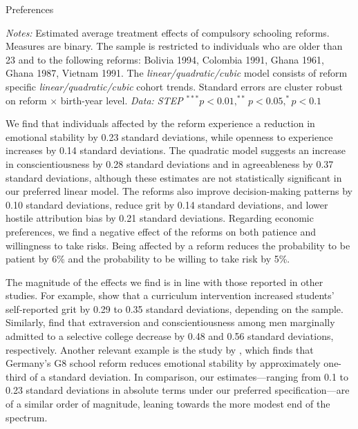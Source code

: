 \begin{table}[htbp]
	\caption{Preferences}
	\label{tab:res_prefs}
	\centering
	\begin{threeparttable}
		\footnotesize
		
		\begin{tablenotes}
			\footnotesize
			\item \textit{Notes:} Estimated average treatment effects of compulsory schooling reforms. Measures are binary. The sample is restricted to individuals who are older than 23 and to the following reforms: Bolivia 1994, Colombia 1991, Ghana 1961, Ghana 1987, Vietnam 1991. The \textit{linear/quadratic/cubic} model consists of reform specific \textit{linear/quadratic/cubic} cohort trends. Standard errors are cluster robust on reform $\times$ birth-year level. \textit{Data: STEP} $^{***} p < 0.01, ^{**} p < 0.05, ^{*} p < 0.1$
		\end{tablenotes}
	\end{threeparttable}
\end{table}


We find that individuals affected by the reform experience a reduction in emotional stability by 0.23 standard deviations, while openness to experience increases by 0.14 standard deviations. The quadratic model suggests an increase in conscientiousness by 0.28 standard deviations and in agreeableness by 0.37 standard deviations, although these estimates are not statistically significant in our preferred linear model.
The reforms also improve decision-making patterns by 0.10 standard deviations, reduce grit by 0.14 standard deviations, and lower hostile attribution bias by 0.21 standard deviations. Regarding economic preferences, we find a negative effect of the reforms on both patience and willingness to take risks. Being affected by a reform reduces the probability to be patient by 6\% and the probability to be willing to take risk by 5\%.

The magnitude of the effects we find is in line with those reported in other studies. For example, \citet{alan_ever_2019} show that a curriculum intervention increased students' self-reported grit by 0.29 to 0.35 standard deviations, depending on the sample. Similarly, \citet{dasgupta_effects_2022} find that extraversion and conscientiousness among men marginally admitted to a selective college decrease by 0.48 and 0.56 standard deviations, respectively. Another relevant example is the study by \citet{dahmann_cross-fertilizing_2018}, which finds that Germany's G8 school reform reduces emotional stability by approximately one-third of a standard deviation. In comparison, our estimates---ranging from 0.1 to 0.23 standard deviations in absolute terms under our preferred specification---are of a similar order of magnitude, leaning towards the more modest end of the spectrum.


